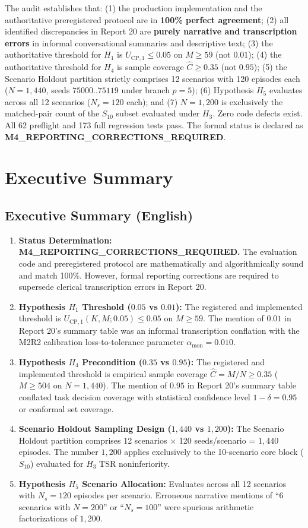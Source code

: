 \documentclass[10pt,a4paper]{article}
\begin{document}
The audit establishes that: (1) the production implementation and the authoritative preregistered protocol are in \textbf{100\% perfect agreement}; (2) all identified discrepancies in Report 20 are \textbf{purely narrative and transcription errors} in informal conversational summaries and descriptive text; (3) the authoritative threshold for $H_1$ is $U_{\mathrm{CP}, 1} \le 0.05$ on $M \ge 59$ (not $0.01$); (4) the authoritative threshold for $H_4$ is sample coverage $\hat{C} \ge 0.35$ (not $0.95$); (5) the Scenario Holdout partition strictly comprises 12 scenarios with 120 episodes each ($N = 1,440$, seeds $75000..75119$ under branch $p=5$); (6) Hypothesis $H_5$ evaluates across all 12 scenarios ($N_s = 120$ each); and (7) $N = 1,200$ is exclusively the matched-pair count of the $S_{10}$ subset evaluated under $H_3$. Zero code defects exist. All 62 preflight and 173 full regression tests pass. The formal status is declared as \textbf{M4\_REPORTING\_CORRECTIONS\_REQUIRED}.

\section{Executive Summary}

\subsection{Executive Summary (English)}
\begin{enumerate}
    \item \textbf{Status Determination: M4\_REPORTING\_CORRECTIONS\_REQUIRED.} The evaluation code and preregistered protocol are mathematically and algorithmically sound and match 100\%. However, formal reporting corrections are required to supersede clerical transcription errors in Report 20.
    \item \textbf{Hypothesis $H_1$ Threshold ($0.05$ vs $0.01$):} The registered and implemented threshold is $U_{\mathrm{CP},1}(K, M; 0.05) \le 0.05$ on $M \ge 59$. The mention of $0.01$ in Report 20's summary table was an informal transcription conflation with the M2R2 calibration loss-to-tolerance parameter $\alpha_{\text{mon}} = 0.010$.
    \item \textbf{Hypothesis $H_4$ Precondition ($0.35$ vs $0.95$):} The registered and implemented threshold is empirical sample coverage $\hat{C} = M / N \ge 0.35$ ($M \ge 504$ on $N = 1,440$). The mention of $0.95$ in Report 20's summary table conflated task decision coverage with statistical confidence level $1 - \delta = 0.95$ or conformal set coverage.
    \item \textbf{Scenario Holdout Sampling Design ($1,440$ vs $1,200$):} The Scenario Holdout partition comprises 12 scenarios $\times$ 120 seeds/scenario = $1,440$ episodes. The number $1,200$ applies exclusively to the 10-scenario core block ($S_{10}$) evaluated for $H_3$ TSR noninferiority.
    \item \textbf{Hypothesis $H_5$ Scenario Allocation:} Evaluates across all 12 scenarios with $N_s = 120$ episodes per scenario. Erroneous narrative mentions of ``6 scenarios with $N=200$'' or ``$N_s = 100$'' were spurious arithmetic factorizations of $1,200$.
\end{enumerate}
\end{document}
